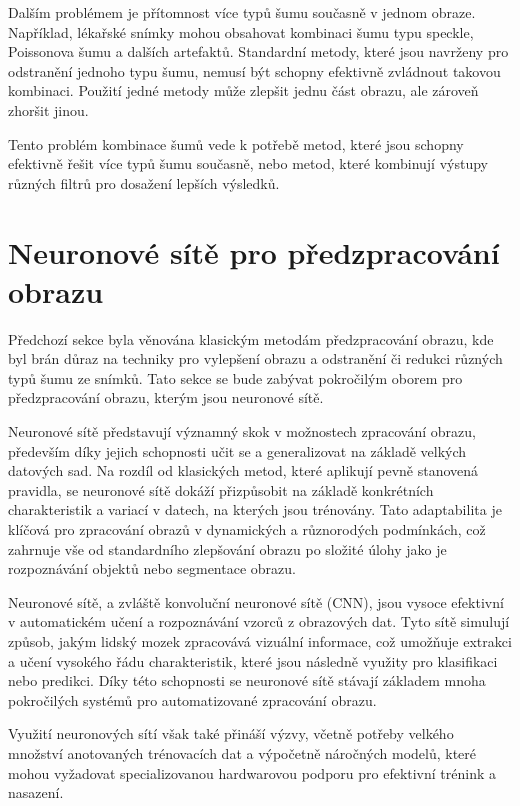 \documentclass[male,czech,api_ing]{thesis}
\begin{document}
Dalším problémem je přítomnost více typů šumu současně v jednom obraze. Například, lékařské snímky mohou obsahovat kombinaci šumu typu speckle, Poissonova šumu a dalších artefaktů. Standardní metody, které jsou navrženy pro odstranění jednoho typu šumu, nemusí být schopny efektivně zvládnout takovou kombinaci. Použití jedné metody může zlepšit jednu část obrazu, ale zároveň zhoršit jinou.

Tento problém kombinace šumů vede k potřebě metod, které jsou schopny efektivně řešit více typů šumu současně, nebo metod, které kombinují výstupy různých filtrů pro dosažení lepších výsledků.


\section{Neuronové sítě pro předzpracování obrazu}
Předchozí sekce byla věnována klasickým metodám předzpracování obrazu, kde byl brán důraz na techniky pro vylepšení obrazu a odstranění či redukci různých typů šumu ze snímků. Tato sekce se bude zabývat pokročilým oborem pro předzpracování obrazu, kterým jsou neuronové sítě.

Neuronové sítě představují významný skok v možnostech zpracování obrazu, především díky jejich schopnosti učit se a generalizovat na základě velkých datových sad. Na rozdíl od klasických metod, které aplikují pevně stanovená pravidla, se neuronové sítě dokáží přizpůsobit na základě konkrétních charakteristik a variací v datech, na kterých jsou trénovány. Tato adaptabilita je klíčová pro zpracování obrazů v dynamických a různorodých podmínkách, což zahrnuje vše od standardního zlepšování obrazu po složité úlohy jako je rozpoznávání objektů nebo segmentace obrazu.

Neuronové sítě, a zvláště konvoluční neuronové sítě (CNN), jsou vysoce efektivní v automatickém učení a rozpoznávání vzorců z obrazových dat. Tyto sítě simulují způsob, jakým lidský mozek zpracovává vizuální informace, což umožňuje extrakci a učení vysokého řádu charakteristik, které jsou následně využity pro klasifikaci nebo predikci. Díky této schopnosti se neuronové sítě stávají základem mnoha pokročilých systémů pro automatizované zpracování obrazu.

Využití neuronových sítí však také přináší výzvy, včetně potřeby velkého množství anotovaných trénovacích dat a výpočetně náročných modelů, které mohou vyžadovat specializovanou hardwarovou podporu pro efektivní trénink a nasazení. 
\end{document}
